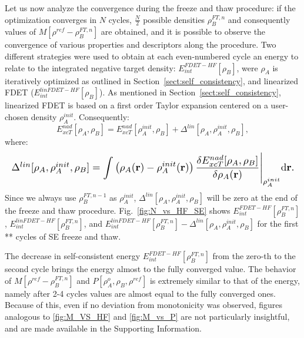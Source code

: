 \documentclass[journal=jctcce,manuscript=article, layout=twocolumn]{achemso}
\begin{document}
Let us now analyze the convergence during the freeze and thaw procedure: if the optimization converges in $N$ cycles, $\frac{N}{2}$ possible densities $\rho_B^{FT,n}$ and consequently values of $M[\rho^{ref} - \rho^{FT,n}_{B}]$ are obtained, and it is possible to observe the convergence of various properties and descriptors along the procedure.
Two different strategies were used to obtain at each even-numbered cycle an energy to relate to the integrated negative target density: $E^{FDET-HF}_{int}[\rho_B]$, were $\rho_A$ is iteratively optimized as outlined in Section~\ref{sect:self_consistency}, and linearized FDET ($E^{linFDET-HF}_{int}[\rho_B]$). 
As mentioned in Section~\ref{sect:self_consistency}, linearized FDET is based on a first order Taylor expansion centered on a user-chosen density $\rho_A^{init}$. Consequently:
\begin{equation}
 E_{xcT}^{nad}[\rho_A,\rho_B] = E_{xcT}^{nad}[\rho_A^{init},\rho_B] + \Delta^{lin}[\rho_A,\rho_A^{init},\rho_B],
\end{equation}
where:
\begin{equation}\label{eq:delta_lin}
    \resizebox{1.0\columnwidth}{!}{%
        $\Delta^{lin}[\rho_A,\rho_A^{init},\rho_B]  = \displaystyle\int \left( \rho_A(\mathbf{r}) -  \rho_A^{init}(\mathbf{r}) \right) \frac{\delta E_{xcT}^{nad}[\rho_A, \rho_B]}{\delta \rho_A(\mathbf{r})}
 \Bigg \vert_{\rho_A^{init}}
 \mathrm{d}\mathbf{r}.$%
        }
\end{equation}
\vspace{0.5ex}
Since we always use $\rho_B^{FT,n-1}$ as $\rho_A^{init}$, $\Delta^{lin}[\rho_A,\rho_A^{init},\rho_B]$ will be zero at the end of the freeze and thaw procedure.
Fig.~\ref{fig:N_vs_HF_SE} shows $E^{FDET-HF}_{int}[\rho_B^{FT,n}]$,  $E^{linFDET-HF}_{int}[\rho_B^{FT,n}]$, and $E^{linFDET-HF}_{int}[\rho_B^{FT,n}] - \Delta^{lin}[\rho_A,\rho_A^{init},\rho_B]$ for the first ** cycles of SE freeze and thaw.

The decrease in self-consistent energy $E^{FDET-HF}_{int}[\rho_B^{FT,n}]$ from the zero-th to the second cycle brings the energy almost to the fully converged value. 
The behavior of $M[\rho^{ref} - \rho^{FT,n}_{B}]$ and $P[\rho^{o}_A, \rho_B, \rho^{ref}]$ is extremely similar to that of the energy, namely after 2-4 cycles values are almost equal to the fully converged ones. Because of this, even if no deviation from monotonicity was observed, figures analogous to \ref{fig:M_VS_HF} and \ref{fig:M_vs_P} are not particularly insightful, and are made available in the Supporting Information. 
\end{document}
